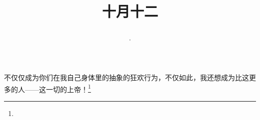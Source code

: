 \title{\date[d=12,m=11,y=2024][year:cn-y,年,month:cn,day:cn,日,·,weekday]·十月十二 }
不仅仅成为你们在我自己身体里的抽象的狂欢行为，不仅如此，我还想成为比这更多的人——这一切的上帝！\footnote{ }


